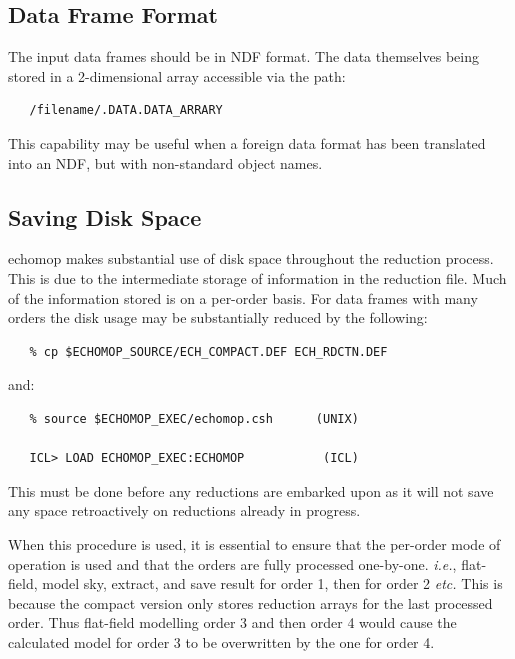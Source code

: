 \documentclass[11pt,twoside]{article}
\newcommand{\xref}[3]{#1}
\newcommand{\xlabel}[1]{}
\newcommand{\mlabel}[1]{\xlabel{#1}\label{#1}}
\newcommand{\myindex}[1]{\index{#1}}
\renewcommand{\myindex}[1]{}
\begin{document}
\subsection{\mlabel{data_frame_format}Data Frame Format}
\myindex{Data frames}

The input data frames should be in \xref{NDF}{sun33}{} format.
The data themselves being stored in a 2-dimensional array accessible via
the path:

\begin{verbatim}
   /filename/.DATA.DATA_ARRARY
\end{verbatim}

This capability may be useful when a foreign data format has been
translated into an \xref{NDF}{sun33}{}, but with non-standard object
names.


\subsection{\mlabel{saving_disk_space}Saving Disk Space}
\myindex{Disk space!running out}

{\sc echomop} makes substantial use of disk space throughout the reduction
process.  This is due to the intermediate storage of information in the
reduction file.  Much of the information stored is on a per-order basis.
For data frames with many orders the disk usage may be substantially
reduced by the following:

\begin{verbatim}
   % cp $ECHOMOP_SOURCE/ECH_COMPACT.DEF ECH_RDCTN.DEF
\end{verbatim}

and:

\begin{verbatim}
   % source $ECHOMOP_EXEC/echomop.csh      (UNIX)

   ICL> LOAD ECHOMOP_EXEC:ECHOMOP           (ICL)
\end{verbatim}

This must be done before any reductions are embarked upon as it will not
save any space retroactively on reductions  already in progress.

When this procedure is used, it is essential to ensure that the
per-order mode of operation is used and that the orders are fully
processed one-by-one. {\it{i.e.}}, flat-field, model sky, extract, and save
result for order 1,  then for order 2 {\it etc.}  This is because the compact
version only stores reduction arrays for the last processed order. Thus
flat-field modelling order 3 and then order 4 would cause the calculated
model for order 3 to be overwritten by the one for order 4.
\end{document}
